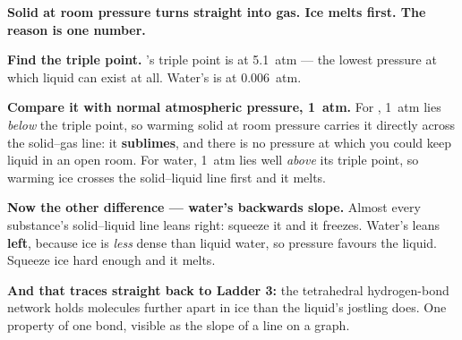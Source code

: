 \documentclass{apchem-worksheet}
\begin{document}
\begin{workedexample}
\textbf{Solid  at room pressure turns straight into gas. Ice
melts first. The reason is one number.}

\textbf{Find the triple point.} 's triple point is at
\SI{5.1}{atm} --- the lowest pressure at which liquid  can exist
at all. Water's is at \SI{0.006}{atm}.

\textbf{Compare it with normal atmospheric pressure, \SI{1}{atm}.} For
, \SI{1}{atm} lies \emph{below} the triple point, so warming
solid  at room pressure carries it directly across the
solid--gas line: it \textbf{sublimes}, and there is no pressure at which
you could keep liquid  in an open room. For water, \SI{1}{atm}
lies well \emph{above} its triple point, so warming ice crosses the
solid--liquid line first and it melts.

\textbf{Now the other difference --- water's backwards slope.} Almost
every substance's solid--liquid line leans right: squeeze it and it
freezes. Water's leans \textbf{left}, because ice is \emph{less} dense
than liquid water, so pressure favours the liquid. Squeeze ice hard
enough and it melts.

\textbf{And that traces straight back to Ladder 3:} the tetrahedral
hydrogen-bond network holds molecules further apart in ice than the
liquid's jostling does. One property of one bond, visible as the slope
of a line on a graph.
\end{workedexample}
\end{document}

